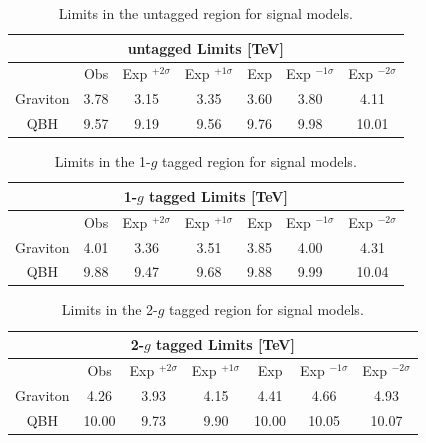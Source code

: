 \begin{table}
	\begin{center} 
		\begin{tabular}{ c c c c c c c }
			\hline
			\multicolumn{7}{c}{ untagged  Limits [TeV]}  \\ \hline
			& Obs & Exp $^{+2\sigma}$&Exp $^{+1\sigma}$ &Exp & Exp $^{-1\sigma}$&Exp $^{-2\sigma}$\\	\hline
			Graviton&3.78 &3.15&3.35  &3.60 &3.80&4.11\\\hline
			QBH&9.57 &9.19&9.56 &9.76 &9.98&10.01\\
			\hline
		\end{tabular}
		\caption{ Limits in the untagged region for signal models.}
		\label{tab:0g}
	\end{center}
\end{table}

\begin{table}
\begin{center} 
\begin{tabular}{ c c c c c c c }
	\hline
	\multicolumn{7}{c}{ 1-$g$ tagged  Limits [TeV]}  \\ \hline
	 & Obs & Exp $^{+2\sigma}$&Exp $^{+1\sigma}$ &Exp & Exp $^{-1\sigma}$&Exp $^{-2\sigma}$\\	\hline
	Graviton&4.01 &3.36&3.51  &3.85 &4.00&4.31\\\hline
QBH&9.88 &9.47&9.68 &9.88 &9.99&10.04\\
	\hline
\end{tabular}
		\caption{ Limits in the 1-$g$ tagged region for signal models.}
\label{tab:1g}
	\end{center}
\end{table}

\begin{table}
\begin{center}
\begin{tabular}{ c c c c c c c }
	\hline
	\multicolumn{7}{c}{ 2-$g$ tagged  Limits [TeV]}  \\ \hline
	& Obs & Exp $^{+2\sigma}$&Exp $^{+1\sigma}$ &Exp & Exp $^{-1\sigma}$&Exp $^{-2\sigma}$\\	\hline
	Graviton&4.26&3.93&4.15 &4.41&4.66&4.93\\\hline
	QBH&10.00 &9.73&9.90 &10.00  &10.05&10.07\\
	\hline
\end{tabular}
	\caption{Limits in the 2-$g$ tagged region for signal models.}
\label{tab:2g}
	\end{center}
\end{table}


